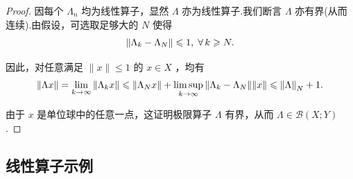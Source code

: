 \begin{proof}
因每个 ${\Lambda }_{n}$ 均为线性算子，显然 $\Lambda$ 亦为线性算子.我们断言 $\Lambda$ 亦有界(从而连续).由假设，可选取足够大的 $N$ 使得
\[
\norm{{\Lambda }_{k} - {\Lambda }_{N}} \leqslant  1,\;\forall\,k \geqslant  N.
\]

因此，对任意满足 $\| x\|  \leq  1$ 的 $x \in  X$ ，均有
\[
\| {\Lambda x}\|  = \mathop{\lim }\limits_{{k \rightarrow  \infty }}\norm{{\Lambda }_{k}x} \leqslant  \norm{{\Lambda }_{N}x} + \mathop{\limsup }\limits_{{k \rightarrow  \infty }}\norm{{\Lambda }_{k} - {\Lambda }_{N}}\| x\|  \leqslant  \norm{\Lambda }_{N} + 1.
\]

由于 $x$ 是单位球中的任意一点，这证明极限算子 $\Lambda$ 有界，从而 $\Lambda  \in  \mathcal{B}\left( {X;Y}\right)$ .
\end{proof}


\subsection{线性算子示例}

